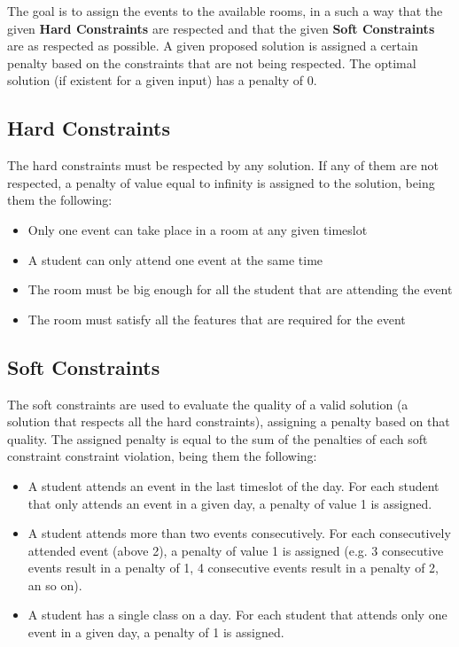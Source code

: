 \documentclass[conference]{IEEEtran}
\begin{document}
The goal is to assign the events to the available rooms, in a such a way that the given \textbf{Hard Constraints} are respected and that the given \textbf{Soft Constraints} are as respected as possible. A given proposed solution is assigned a certain penalty based on the constraints that are not being respected. The optimal solution (if existent for a given input) has a penalty of 0.

\subsection{Hard Constraints}

The hard constraints must be respected by any solution. If any of them are not respected, a penalty of value equal to infinity is assigned to the solution, being them the following:

\begin{itemize}
    \item Only one event can take place in a room at any given timeslot
    \item A student can only attend one event at the same time
    \item The room must be big enough for all the student that are attending the event
    \item The room must satisfy all the features that are required for the event
\end{itemize}

\subsection{Soft Constraints}

The soft constraints are used to evaluate the quality of a valid solution (a solution that respects all the hard constraints), assigning a penalty based on that quality. The assigned penalty is equal to the sum of the penalties of each soft constraint constraint violation, being them the following: 

\begin{itemize}
    \item A student attends an event in the last timeslot of the day. For each student that only attends an event in a given day, a penalty of value 1 is assigned.
    \item A student attends more than two events consecutively. For each consecutively attended event (above 2), a penalty of value 1 is assigned (e.g. 3 consecutive events result in a penalty of 1, 4 consecutive events result in a penalty of 2, an so on). 
    \item A student has a single class on a day. For each student that attends only one event in a given day, a penalty of 1 is assigned.
\end{itemize}
\end{document}
